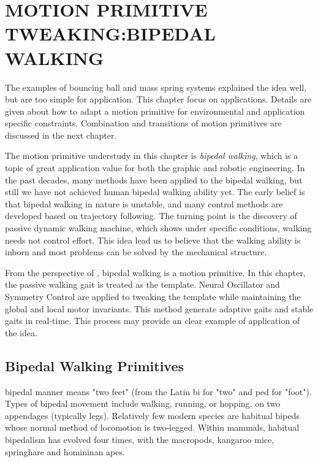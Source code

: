 \chapter{MOTION PRIMITIVE TWEAKING:BIPEDAL WALKING}
\label{chap:walk}
\graphicspath{{BipedWalk/BipedWalkFigs/EPS/}{BipedWalk/BipedWalkFigs/}}


The examples of bouncing ball and mass spring systems explained the idea well, but are too simple for \cms application.
This chapter focus on applications.  
Details are given about how to adapt a motion primitive for  environmental and application specific constraints.
Combination and transitions of motion primitives are discussed in the next chapter.


The motion primitive understudy in this chapter is \emph{bipedal walking}, which is a topic of great application value for both the graphic and robotic engineering.
In the past decades, many methods have been applied to the bipedal walking, but still we have not achieved  human bipedal walking ability yet.
The early belief is that bipedal walking in nature is unstable, and many control methods are developed based on trajectory following.
The turning point is the discovery of passive dynamic walking machine, which shows under specific conditions, walking needs not control effort.
This idea lead us to believe that the walking ability is inborn and most problems can be solved by the mechanical structure.

From the perspective of \moit, bipedal walking is  a motion primitive.
In this chapter, the passive walking gait is treated as the template.
Neural Oscillator and Symmetry Control are applied to tweaking the template while maintaining the global and local motor invariants.
This method generate adaptive gaits and stable gaits in real-time.
This process may provide an clear example of application of the \moit idea.




\section{Bipedal Walking Primitives}


bipedal manner means "two feet" (from the Latin bi for "two" and ped for "foot"). 
Types of bipedal movement include walking, running, or hopping, on two appendages (typically legs).
Relatively few modern species are habitual bipeds whose normal method of locomotion is two-legged. 
Within mammals, habitual bipedalism has evolved four times, with the macropods, kangaroo mice, springhare and homininan apes. 

